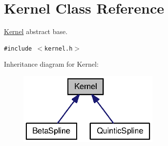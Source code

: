 \hypertarget{classKernel}{
\section{Kernel Class Reference}
\label{classKernel}
}
\hyperlink{classKernel}{Kernel} abstract base.  


{\tt \#include $<$kernel.h$>$}

Inheritance diagram for Kernel:\nopagebreak
\begin{figure}[H]
\begin{center}
\leavevmode
\includegraphics[width=198pt]{classKernel__inherit__graph}
\end{center}
\end{figure}
